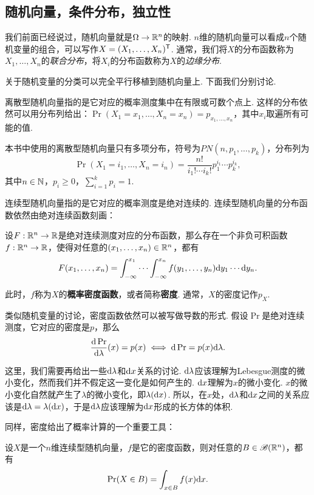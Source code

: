 \subsection{随机向量，条件分布，独立性}\label{subsec:random-vector}

我们前面已经说过，随机向量就是$\Omega\to\mathbb{R}^n$的映射. $n$维的随机向量可以看成$n$个随机变量的组合，可以写作$X=(X_1,\dots,X_n)^{\mathsf{T}}$. 通常，我们将$X$的分布函数称为$X_1,\dots,X_n$的\emph{联合分布}，将$X_i$的分布函数称为$X$的\emph{边缘分布}.

关于随机变量的分类可以完全平行移植到随机向量上. 下面我们分别讨论. 

离散型随机向量指的是它对应的概率测度集中在有限或可数个点上. 这样的分布依然可以用分布列给出：$\Pr(X_1=x_1,\dots,X_n=x_n)=p_{x_1,\dots,x_n}$，其中$x_i$取遍所有可能的值. 

本书中使用的离散型随机向量只有多项分布，符号为$PN(n,p_1,\dots,p_k)$，分布列为
\[\Pr(X_1=i_1,\dots,X_n=i_n)=\frac{n!}{i_1!\cdots i_k!}p_1^{i_1}\cdots p_k^{i_k},\]
其中$n\in\mathbb{N}$，$p_i\geq 0$，$\sum_{i=1}^k p_i=1$. 

连续型随机向量指的是它对应的概率测度是绝对连续的. 连续型随机向量的分布函数依然由绝对连续函数刻画：

\begin{theorem}\label{thm:continuous-vector}
设$F:\mathbb{R}^n\to\mathbb{R}$是绝对连续测度对应的分布函数，那么存在一个非负可积函数$f:\mathbb{R}^n\to\mathbb{R}$，使得对任意的$(x_1,\dots,x_n)\in\mathbb{R}^n$，都有
\[F(x_1,\dots,x_n)=\int_{-\infty}^{x_1}\cdots\int_{-\infty}^{x_n}f(y_1,\dots,y_n)\mathrm{d} y_1\cdots\mathrm{d} y_n.\]
\end{theorem}

此时，$f$称为$X$的\textbf{概率密度函数}，或者简称\textbf{密度}. 通常，$X$的密度记作$p_X$.

类似随机变量的讨论，密度函数依然可以被写做导数的形式. 假设$\Pr$是绝对连续测度，它对应的密度是$p$，那么
\[\frac{\mathrm{d}\Pr}{\mathrm{d}\lambda}(x)=p(x)\iff \mathrm{d}\Pr=p(x)\mathrm{d}\lambda.\]

这里，我们需要再给出一些$\mathrm{d}\lambda$和$\mathrm{d} x$关系的讨论. $\mathrm{d}\lambda$应该理解为Lebesgue测度的微小变化，然而我们并不假定这一变化是如何产生的. $\mathrm{d} x$理解为$x$的微小变化. $x$的微小变化自然就产生了$\lambda$的微小变化，即$\lambda(\mathrm{d} x)$. 所以，在$x$处，$\mathrm{d}\lambda$和$\mathrm{d} x$之间的关系应该是$\mathrm{d}\lambda=\lambda(\mathrm{d} x)$，于是$\mathrm{d}\lambda$应该理解为$\mathrm{d} x$形成的长方体的体积. 

同样，密度给出了概率计算的一个重要工具：
\begin{theorem}\label{thm:continuous-prob-vec}
    设$X$是一个$n$维连续型随机向量，$f$是它的密度函数，则对任意的$B\in\mathscr{B}(\mathbb{R}^n)$，都有
    \[\Pr(X\in B)=\int_{x\in B}f(x)\mathrm{d} x.\]
\end{theorem}

